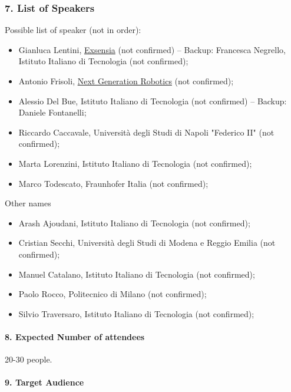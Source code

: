 \documentclass{article}
\begin{document}
\subsubsection*{7. List of Speakers}
Possible list of speaker (not in order):
\begin{itemize}
    \item Gianluca Lentini, \href{https://exsensia.ai/}{Exsensia} (not confirmed) -- Backup:
    Francesca Negrello, Istituto Italiano di Tecnologia (not confirmed);
    \item Antonio Frisoli, \href{https://nextgen-robotics.it/}{Next Generation Robotics} (not confirmed);
    \item Alessio Del Bue, Istituto Italiano di Tecnologia (not confirmed) -- Backup: Daniele Fontanelli;
    \item Riccardo Caccavale, Università degli Studi di Napoli "Federico II" (not confirmed);
    \item Marta Lorenzini, Istituto Italiano di Tecnologia (not confirmed);
    \item Marco Todescato, Fraunhofer Italia (not confirmed);
\end{itemize}
Other names
\begin{itemize}
    \item Arash Ajoudani, Istituto Italiano di Tecnologia (not confirmed);
    \item Cristian Secchi, Università degli Studi di Modena e Reggio Emilia (not confirmed);
    \item Manuel Catalano, Istituto Italiano di Tecnologia (not confirmed);
    \item Paolo Rocco, Politecnico di Milano (not confirmed);
    \item Silvio Traversaro, Istituto Italiano di Tecnologia (not confirmed);
\end{itemize}


\paragraph{8. Expected Number of attendees} 20-30 people.


\paragraph{9. Target Audience} 
\end{document}
